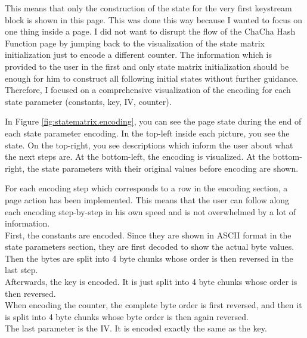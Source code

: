 This means that only the construction of the state for the very first keystream block is shown in this page. This was done this way because I wanted to focus on one thing inside a page. I did not want to disrupt the flow of the ChaCha Hash Function page by jumping back to the visualization of the state matrix initialization just to encode a different counter. The information which is provided to the user in the first and only state matrix initialization should be enough for him to construct all following initial states without further guidance. Therefore, I focused on a comprehensive visualization of the encoding for each state parameter (constants, key, IV, counter). 

In Figure \ref{fig:statematrix.encoding}, you can see the page state during the end of each state parameter encoding. In the top-left inside each picture, you see the state. On the top-right, you see descriptions which inform the user about what the next steps are. At the bottom-left, the encoding is visualized. At the bottom-right, the state parameters with their original values before encoding are shown.

For each encoding step which corresponds to a row in the encoding section, a page action has been implemented. This means that the user can follow along each encoding step-by-step in his own speed and is not overwhelmed by a lot of information.\\
First, the constants are encoded. Since they are shown in ASCII format in the state parameters section, they are first decoded to show the actual byte values. Then the bytes are split into 4 byte chunks whose order is then reversed in the last step. \\
Afterwards, the key is encoded. It is just split into 4 byte chunks whose order is then reversed. \\
When encoding the counter, the complete byte order is first reversed, and then it is split into 4 byte chunks whose byte order is then again reversed. \\
The last parameter is the IV. It is encoded exactly the same as the key. \\

